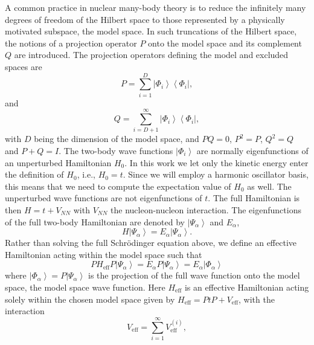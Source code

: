 A common practice in nuclear many-body theory is to reduce the infinitely
many degrees of freedom of the Hilbert space to those represented
by a physically motivated subspace, the model space.
In such truncations of the Hilbert space, the notions of a projection
operator $P$ onto the model space and its complement $Q$ are
introduced. The projection operators defining the model and excluded
spaces are
\begin{equation}
        P=\sum_{i=1}^{D} \left|\Phi_i\right\rangle
        \left\langle\Phi_i\right |,
\label{eq:poperator}
\end{equation}
and
\begin{equation}
        Q=\sum_{i=D+1}^{\infty} \left|\Phi_i\right\rangle
        \left\langle\Phi_i\right |,
\label{eq:qoperator}
\end{equation}
with $D$ being the dimension of the model space, and $PQ=0$, $P^2 =P$,
$Q^2 =Q$ and $P+Q=I$. The two-body wave functions $\left|\Phi_i\right\rangle$ 
are normally eigenfunctions
of an unperturbed Hamiltonian $H_0$. In this work we let only the kinetic energy
enter the definition of $H_0$, i.e., $H_0=t$. 
Since we will employ a harmonic oscillator basis, this means that 
we need to  compute  the expectation value of $H_0$ as well. The unperturbed wave functions are not eigenfunctions of $t$. 
The full Hamiltonian
is then $H=t+V_{NN}$ with $V_{NN}$ the
nucleon-nucleon interaction.
The eigenfunctions of the full two-body Hamiltonian are denoted by
$\left|\Psi_{\alpha}\right\rangle$
and $E_{\alpha}$,
\begin{equation}
                H\left|\Psi_{\alpha}\right\rangle= 
                E_{\alpha}\left|\Psi_{\alpha}\right\rangle.
\end{equation}
Rather than solving the full Schr\"{o}dinger equation above, we define
an effective Hamiltonian acting within the model space such
that
\begin{equation}
               PH_{\mathrm{eff}}P\left|\Psi_{\alpha}\right\rangle=
               E_{\alpha}P\left|\Psi_{\alpha}\right\rangle=
              E_{\alpha}\left|\Phi_{\alpha}\right\rangle
\end{equation}
where $\left|\Phi_{\alpha}\right\rangle=P\left|\Psi_{\alpha}\right\rangle$
is the projection of the full wave function
onto the model space, the model space wave function.
Here $H_{\mathrm{eff}}$  is an effective Hamiltonian acting solely
within the chosen model space
given by $H_{\mathrm{eff}}=PtP+V_{\mathrm{eff}}$, with the interaction
\begin{equation}
  V_{\mathrm{eff}}=\sum_{i=1}^{\infty} V_{\mathrm{eff}}^{(i)},
\end{equation}

